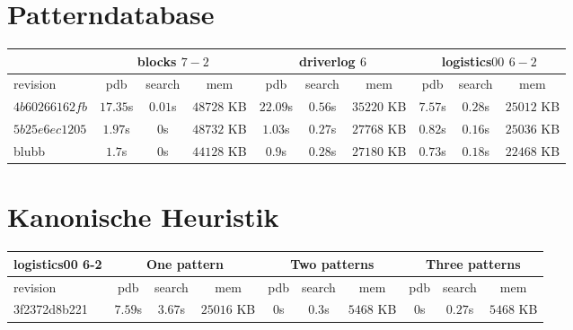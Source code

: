 \documentclass[a4paper,12pt]{scrartcl}
\begin{document}
\section{Patterndatabase}

\begin{tabular}{|l|c|c|c|c|c|c|c|c|c|}\hline
& \multicolumn{3}{c|}{blocks $7-2$} & \multicolumn{3}{c|}{driverlog $6$} & \multicolumn{3}{c|}{logistics$00$ $6-2$}\\\hline
revision & pdb & search & mem & pdb & search & mem & pdb & search & mem\\\hline
$4b60266162fb$ & $17.35$s & $0.01$s & $48728$ KB & $22.09$s & $0.56$s & $35220$ KB & $7.57$s & $0.28$s & $25012$ KB\\\hline
$5b25e6ec1205$ & $1.97$s & $0$s & $48732$ KB & $1.03$s & $0.27$s & $27768$ KB & $0.82$s & $0.16$s & $25036$ KB\\\hline
blubb & $1.7$s & $0$s & $44128$ KB & $0.9$s & $0.28$s & $27180$ KB & $0.73$s & $0.18$s & $22468$ KB\\\hline
\end{tabular}

\section{Kanonische Heuristik}

\begin{tabular}{|l|c|c|c|c|c|c|c|c|c|}\hline
logistics00 6-2 & \multicolumn{3}{c|}{One pattern} & \multicolumn{3}{c|}{Two patterns} & \multicolumn{3}{c|}{Three patterns}\\\hline
revision & pdb & search & mem & pdb & search & mem & pdb & search & mem\\\hline
3f2372d8b221 & $7.59$s & $3.67$s & $25016$ KB & $0$s & $0.3$s & $5468$ KB & $0$s & $0.27$s & $5468$ KB\\\hline
\end{tabular}
\end{document}

